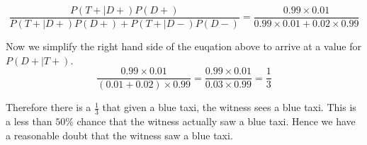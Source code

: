 \documentclass[a4paper,11pt]{article}
\begin{document}
\begin{equation}
\frac{ P \left( T+ \mid D+ \right) P \left( D+ \right) }
    { P \left( T+ \mid D+ \right) P \left( D+ \right) 
      + P \left( T+ \mid D- \right) P \left(D- \right)}
  = \frac{ 0.99 \times 0.01 }
  { 0.99 \times 0.01 + 0.02 \times 0.99 }
\end{equation}

Now we simplify the right hand side of the euqation above to arrive at
a value for $P \left( D+ \mid T+ \right)$.
\begin{equation}
 \frac{ 0.99 \times 0.01 }
  {  \left(0.01 + 0.02 \right) \times 0.99 }
  = \frac{ 0.99 \times 0.01 }
  {  0.03 \times 0.99 }
  = \frac{1}{3}
\end{equation}

Therefore there is a $\frac{1}{3}$ that given a blue taxi, the witness
sees a blue taxi.  This is a less than $50\%$ chance that the witness
actually saw a blue taxi. Hence we have a reasonable doubt that the 
witness saw a blue taxi.

\printbibliography{}
\end{document}
